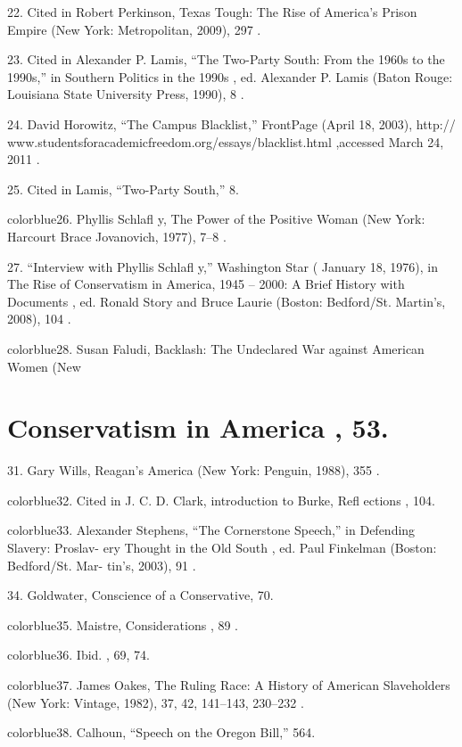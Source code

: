 	{\color{blue}22}. Cited in Robert Perkinson, Texas Tough: The Rise of America’s Prison Empire (New York: Metropolitan, 2009), 297 .


	{\color{blue}23}. Cited in Alexander P. Lamis, “The Two-Party South: From the 1960s to the 1990s,” in Southern Politics in the 1990s , ed. Alexander P. Lamis (Baton Rouge: Louisiana State University Press, 1990), 8 .


	{\color{blue}24}. David Horowitz, “The Campus Blacklist,” FrontPage (April 18, 2003), http:// www.studentsforacademicfreedom.org/essays/blacklist.html ,accessed March 24, 2011 .


	{\color{blue}25}. Cited in Lamis, “Two-Party South,” 8.


	{color{blue}26}. Phyllis Schlafl y, The Power of the Positive Woman (New York: Harcourt Brace Jovanovich, 1977), 7–8 .


	{\color{blue}27}. “Interview with Phyllis Schlafl y,” Washington Star ( January 18, 1976), in The Rise of Conservatism in America, 1945 – 2000: A Brief History with Documents , ed. Ronald Story and Bruce Laurie (Boston: Bedford/St. Martin’s, 2008), 104 .


	{color{blue}28}. Susan Faludi, Backlash: The Undeclared War against American Women (New


\section{Conservatism in America , 53.}


	{\color{blue}31}. Gary Wills, Reagan’s America (New York: Penguin, 1988), 355 .


	{color{blue}32}. Cited in J. C. D. Clark, introduction to Burke, Refl ections , 104.


	{color{blue}33}. Alexander Stephens, “The Cornerstone Speech,” in Defending Slavery: Proslav- ery Thought in the Old South , ed. Paul Finkelman (Boston: Bedford/St. Mar- tin’s, 2003), 91 .


	{\color{blue}34}. Goldwater, Conscience of a Conservative, 70.


	{color{blue}35}. Maistre, Considerations , 89 .


	{color{blue}36}. Ibid. , 69, 74.


	{color{blue}37}. James Oakes, The Ruling Race: A History of American Slaveholders (New York: Vintage, 1982), 37, 42, 141–143, 230–232 .


	{color{blue}38}. Calhoun, “Speech on the Oregon Bill,” 564.


